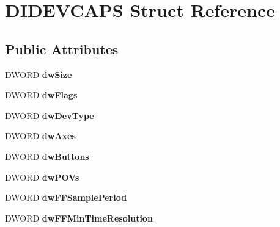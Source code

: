 \hypertarget{struct_d_i_d_e_v_c_a_p_s}{\section{D\-I\-D\-E\-V\-C\-A\-P\-S Struct Reference}
\label{struct_d_i_d_e_v_c_a_p_s}
}
\subsection*{Public Attributes}
\begin{DoxyCompactItemize}
\item 
\hypertarget{struct_d_i_d_e_v_c_a_p_s_a7e9d9de15875754c37a3a63b6b4d91e3}{D\-W\-O\-R\-D {\bfseries dw\-Size}}\label{struct_d_i_d_e_v_c_a_p_s_a7e9d9de15875754c37a3a63b6b4d91e3}

\item 
\hypertarget{struct_d_i_d_e_v_c_a_p_s_a907348155df993da724b0c9ed52b1ca3}{D\-W\-O\-R\-D {\bfseries dw\-Flags}}\label{struct_d_i_d_e_v_c_a_p_s_a907348155df993da724b0c9ed52b1ca3}

\item 
\hypertarget{struct_d_i_d_e_v_c_a_p_s_af1009ed5cf45d2b7c18458de314444ee}{D\-W\-O\-R\-D {\bfseries dw\-Dev\-Type}}\label{struct_d_i_d_e_v_c_a_p_s_af1009ed5cf45d2b7c18458de314444ee}

\item 
\hypertarget{struct_d_i_d_e_v_c_a_p_s_a2784eed7d0fe11cd12da1735baacd067}{D\-W\-O\-R\-D {\bfseries dw\-Axes}}\label{struct_d_i_d_e_v_c_a_p_s_a2784eed7d0fe11cd12da1735baacd067}

\item 
\hypertarget{struct_d_i_d_e_v_c_a_p_s_a51eaf3f1838f52973a2bf4708d0b4354}{D\-W\-O\-R\-D {\bfseries dw\-Buttons}}\label{struct_d_i_d_e_v_c_a_p_s_a51eaf3f1838f52973a2bf4708d0b4354}

\item 
\hypertarget{struct_d_i_d_e_v_c_a_p_s_a749ea8eff5fbac84be6636db1301fe56}{D\-W\-O\-R\-D {\bfseries dw\-P\-O\-Vs}}\label{struct_d_i_d_e_v_c_a_p_s_a749ea8eff5fbac84be6636db1301fe56}

\item 
\hypertarget{struct_d_i_d_e_v_c_a_p_s_a3caab3a620e0b93b228dc3304ddb888a}{D\-W\-O\-R\-D {\bfseries dw\-F\-F\-Sample\-Period}}\label{struct_d_i_d_e_v_c_a_p_s_a3caab3a620e0b93b228dc3304ddb888a}

\item 
\hypertarget{struct_d_i_d_e_v_c_a_p_s_af8cf75fc375eb15f21841bd624ea34dd}{D\-W\-O\-R\-D {\bfseries dw\-F\-F\-Min\-Time\-Resolution}}\label{struct_d_i_d_e_v_c_a_p_s_af8cf75fc375eb15f21841bd624ea34dd}


\end{DoxyCompactItemize}
